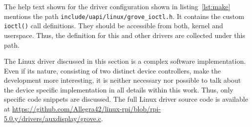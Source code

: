 %
The help text shown for the driver configuration shown in listing~\ref{lst:make} mentions the path \texttt{include/uapi/linux/grove\_ioctl.h}.
It contains the custom \texttt{ioctl()} call definitions.
They should be accessible from both, kernel and userspace.
Thus, the definition for this and other drivers are collected under this path.

The Linux driver discussed in this section is a complex software implementation.
Even if its nature, consisting of two distinct device controllers, make the development more interesting, it is neither necessary nor possible to talk about the device specific implementation in all details within this work.
Thus, only specific code snippets are discussed.
The full Linux driver source code is available at \url{https://github.com/Allegra42/linux-rpi/blob/rpi-5.0.y/drivers/auxdisplay/grove.c}.

